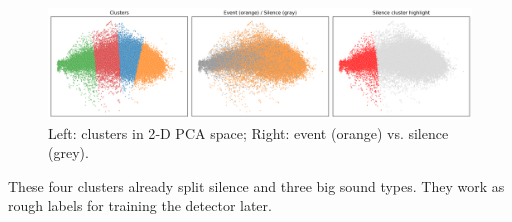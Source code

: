\documentclass{article}
\begin{document}
\begin{figure}[h]
    \centering
    \includegraphics[width=.45\linewidth]{figs_tang/03_pca_clusters.png}
    \caption{Left: clusters in 2‑D PCA space; Right: event (orange) vs. silence (grey).}
    \label{fig:pca_scatter}
\end{figure}

These four clusters already split silence and three big sound types. They work as rough labels for training the detector later.

\end{document}
